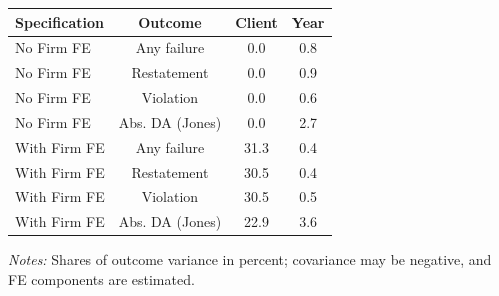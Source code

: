 \documentclass[10pt]{article}
\begin{document}
\begin{minipage}{19cm}\fontsize{10}{12}\selectfont\setlength{\tabcolsep}{4pt}\renewcommand{\arraystretch}{1.12}


\centering
{}
\begin{threeparttable}
\begin{tabular}{p{}ccc}
\toprule
Specification & Outcome & Client & Year \\
\midrule
No Firm FE & Any failure & 0.0 & 0.8 \\
No Firm FE & Restatement & 0.0 & 0.9 \\
No Firm FE & Violation & 0.0 & 0.6 \\
No Firm FE & Abs. DA (Jones) & 0.0 & 2.7 \\
With Firm FE & Any failure & 31.3 & 0.4 \\
With Firm FE & Restatement & 30.5 & 0.4 \\
With Firm FE & Violation & 30.5 & 0.5 \\
With Firm FE & Abs. DA (Jones) & 22.9 & 3.6 \\
\bottomrule
\end{tabular}
\begin{tablenotes}\fontsize{9}{11}\selectfont
\item \raggedright \fontsize{9}{11}\selectfont \textit{Notes:} Shares of outcome variance in percent; covariance may be negative, and FE components are estimated.
\end{tablenotes}
\end{threeparttable}

\end{minipage}
\end{document}
